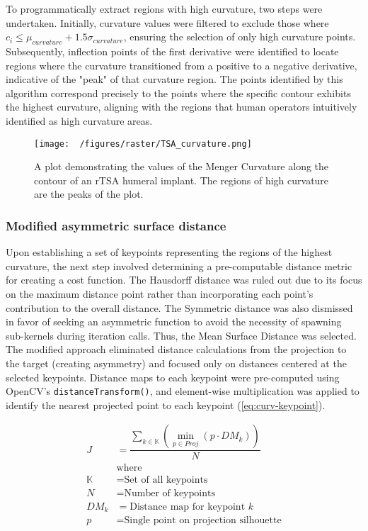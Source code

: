 To programmatically extract regions with high curvature, two steps were undertaken.
Initially, curvature values were filtered to exclude those where $c_{i} \le \mu_{curvature} + 1.5\sigma_{curvature}$, ensuring the selection of only high curvature points.
Subsequently, inflection points of the first derivative were identified to locate regions where the curvature transitioned from a positive to a negative derivative, indicative of the "peak" of that curvature region.
The points identified by this algorithm correspond precisely to the points where the specific contour exhibits the highest curvature, aligning with the regions that human operators intuitively identified as high curvature areas.


\begin{figure}[h!]
  \centering
  \texttt{[image: ~/figures/raster/TSA\_curvature.png]}
  \caption{A plot demonstrating the values of the Menger Curvature along the contour of an rTSA humeral implant. The regions of high curvature are the peaks of the plot.}
  \label{fig:tsa-curv}
\end{figure}



\subsubsection{Modified asymmetric surface distance}
Upon establishing a set of keypoints representing the regions of the highest curvature, the next step involved determining a pre-computable distance metric for creating a cost function.
The Hausdorff distance was ruled out due to its focus on the maximum distance point rather than incorporating each point's contribution to the overall distance.
The Symmetric distance was also dismissed in favor of seeking an asymmetric function to avoid the necessity of spawning sub-kernels during iteration calls.
Thus, the Mean Surface Distance was selected.
The modified approach eliminated distance calculations from the projection to the target (creating asymmetry) and focused only on distances centered at the selected keypoints.
Distance maps to each keypoint were pre-computed using OpenCV's \texttt{distanceTransform()}, and element-wise multiplication was applied to identify the nearest projected point to each keypoint (\cref{eq:curv-keypoint}).

\begin{equation}
  \label{eq:curv-keypoint}
  \begin{split}
    \displaystyle J &= \dfrac{\sum_{k \in \mathbb{K}}(\min_{p\in Proj}(p \cdot DM_{k}))}{N} \\
      &\text{where}\\
    \mathbb{K} &= \text{Set of all keypoints} \\
    N &= \text{Number of keypoints} \\
    DM_{k} &= \text{Distance map for keypoint $k$} \\
    p &= \text{Single point on projection silhouette}
  \end{split}
\end{equation}


